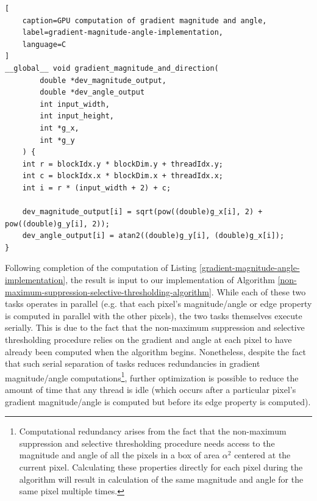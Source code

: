 \documentclass[journal]{IEEEtran}
\begin{document}
\begin{lstlisting}[
	caption=GPU computation of gradient magnitude and angle,
	label=gradient-magnitude-angle-implementation,
	language=C
]
__global__ void gradient_magnitude_and_direction(
		double *dev_magnitude_output,
		double *dev_angle_output
		int input_width,
		int input_height,
		int *g_x,
		int *g_y
	) {
	int r = blockIdx.y * blockDim.y + threadIdx.y;
	int c = blockIdx.x * blockDim.x + threadIdx.x;
	int i = r * (input_width + 2) + c;
	
	dev_magnitude_output[i] = sqrt(pow((double)g_x[i], 2) + pow((double)g_y[i], 2));
	dev_angle_output[i] = atan2((double)g_y[i], (double)g_x[i]);
}
\end{lstlisting}
Following completion of the computation of Listing \ref{gradient-magnitude-angle-implementation}, the result is input to our implementation of Algorithm \ref{non-maximum-suppression-selective-thresholding-algorithm}. While each of these two tasks operates in parallel (e.g. that each pixel's magnitude/angle or edge property is computed in parallel with the other pixels), the two tasks themselves execute serially. This is due to the fact that the non-maximum suppression and selective thresholding procedure relies on the gradient and angle at each pixel to have already been computed when the algorithm begins. Nonetheless, despite the fact that such serial separation of tasks reduces redundancies in gradient magnitude/angle computations\footnote{Computational redundancy arises from the fact that the non-maximum suppression and selective thresholding procedure needs access to the magnitude and angle of all the pixels in a box of area $\alpha^2$ centered at the current pixel. Calculating these properties directly for each pixel during the algorithm will result in calculation of the same magnitude and angle for the same pixel multiple times.}, further optimization is possible to reduce the amount of time that any thread is idle (which occurs after a particular pixel's gradient magnitude/angle is computed but before its edge property is computed).
\end{document}
